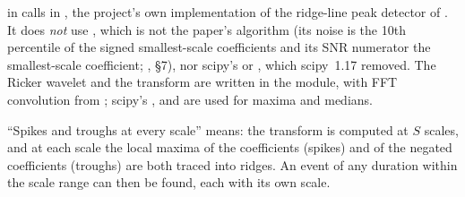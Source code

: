  in  calls  in
, the project's own implementation of the ridge-line peak
detector of \citet{du2006improved}. It does \emph{not} use ,
which is not the paper's algorithm (its noise is the 10th percentile of the signed smallest-scale
coefficients and its SNR numerator the smallest-scale coefficient;
, \S7), nor scipy's  or
, which scipy~1.17 removed. The Ricker wavelet and the transform are written in the
module, with FFT convolution from ; scipy's ,
 and  are used for maxima and medians.

``Spikes and troughs at every scale'' means: the transform is computed at $S$ scales, and at
each scale the local maxima of the coefficients (spikes) and of the negated coefficients
(troughs) are both traced into ridges. An event of any duration within the scale range can
then be found, each with its own scale.

